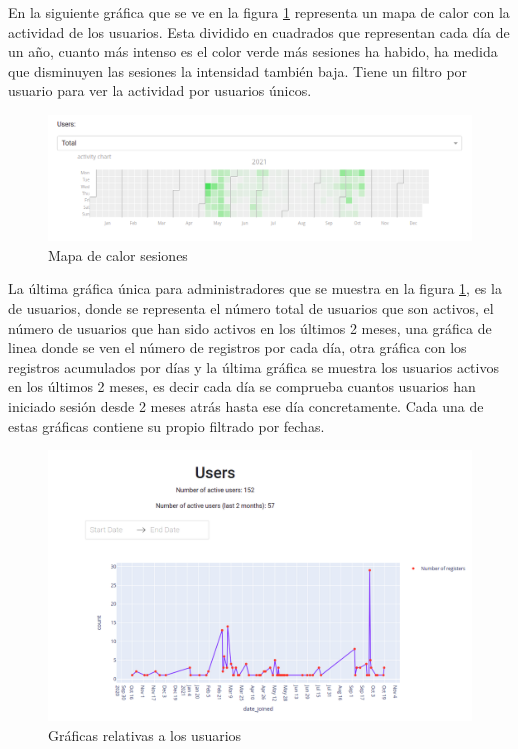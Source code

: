 En la siguiente gráfica que se ve en la figura \ref{fig:activity} representa un mapa de calor con la actividad de los usuarios. Esta dividido en cuadrados que representan cada día de un año, cuanto más intenso es el color verde más sesiones ha habido, ha medida que disminuyen las sesiones la intensidad también baja. Tiene un filtro por usuario para ver la actividad por usuarios únicos.


\begin{figure}[H]
    \centering
    \includegraphics[width=17cm, keepaspectratio]{img/activity.png}
    \caption{Mapa de calor sesiones}
    \label{fig:activity}
\end{figure}
\newpage
La última gráfica única para administradores que se muestra en la figura \ref{fig:activity}, es la de usuarios, donde se representa el número total de usuarios que son activos, el número de usuarios que han sido activos en los últimos 2 meses, una gráfica de linea donde se ven el número de registros por cada día, otra gráfica con los registros acumulados por días y la última gráfica se muestra los usuarios activos en los últimos 2 meses, es decir cada día se comprueba cuantos usuarios han iniciado sesión desde 2 meses atrás hasta ese día concretamente. Cada una de estas gráficas contiene su propio filtrado por fechas.

\begin{figure}[H]
    \centering
    \includegraphics[width=17cm, keepaspectratio]{img/users.png}
    \caption{Gráficas relativas a los usuarios}
    \label{fig:users}
\end{figure}


